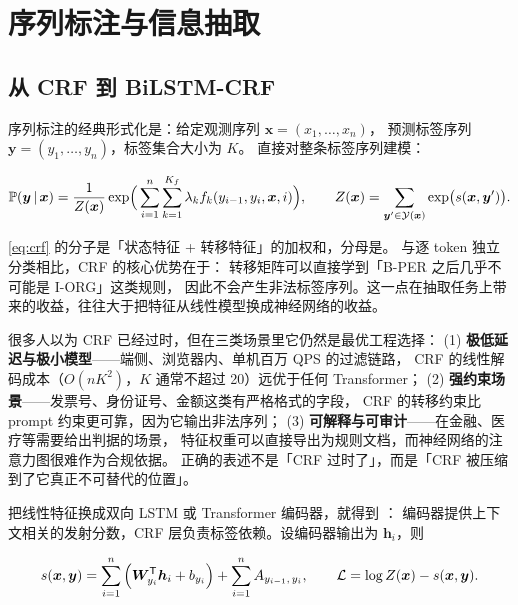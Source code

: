 \section{序列标注与信息抽取}

\subsection{从 CRF 到 BiLSTM-CRF}

序列标注的经典形式化是：给定观测序列 $\bm{x} = (x_1,\dots,x_n)$，
预测标签序列 $\bm{y} = (y_1,\dots,y_n)$，标签集合大小为 $K$。
 \cite{lafferty2001crf} 直接对整条标签序列建模：

\begin{equation}
\operatorname{\mathbb{P}}(\bm{y} \,\vert\, \bm{x}) = \frac{1}{Z(\bm{x})}
\exp\!\Big( \sum_{i=1}^{n} \sum_{k=1}^{K_f} \lambda_k f_k(y_{i-1}, y_i, \bm{x}, i) \Big),
\qquad
Z(\bm{x}) = \sum_{\bm{y}' \in \mathcal{Y}(\bm{x})} \exp\!\big( s(\bm{x}, \bm{y}') \big).
\label{eq:crf}
\end{equation}

\cref{eq:crf} 的分子是「状态特征 + 转移特征」的加权和，分母是。
与逐 token 独立分类相比，CRF 的核心优势在于：
转移矩阵可以直接学到「B-PER 之后几乎不可能是 I-ORG」这类规则，
因此不会产生非法标签序列。这一点在抽取任务上带来的收益，往往大于把特征从线性模型换成神经网络的收益。

\begin{insight}
很多人以为 CRF 已经过时，但在三类场景里它仍然是最优工程选择：
(1) \textbf{极低延迟与极小模型}——端侧、浏览器内、单机百万 QPS 的过滤链路，
CRF 的线性解码成本（$O(nK^2)$，$K$ 通常不超过 20）远优于任何 Transformer；
(2) \textbf{强约束场景}——发票号、身份证号、金额这类有严格格式的字段，
CRF 的转移约束比 prompt 约束更可靠，因为它输出非法序列；
(3) \textbf{可解释与可审计}——在金融、医疗等需要给出判据的场景，
特征权重可以直接导出为规则文档，而神经网络的注意力图很难作为合规依据。
正确的表述不是「CRF 过时了」，而是「CRF 被压缩到了它真正不可替代的位置」。
\end{insight}

把线性特征换成双向 LSTM 或 Transformer 编码器，就得到 ：
编码器提供上下文相关的发射分数，CRF 层负责标签依赖。设编码器输出为 $\bm{h}_i$，则

\begin{equation}
s(\bm{x}, \bm{y}) = \sum_{i=1}^{n} \Big( \bm{W}_{y_i}^{\mathsf{T}} \bm{h}_i + b_{y_i} \Big)
+ \sum_{i=1}^{n} A_{y_{i-1},\, y_i},
\qquad
\mathcal{L} = \log Z(\bm{x}) - s(\bm{x}, \bm{y}).
\label{eq:bilstm-crf}
\end{equation}

